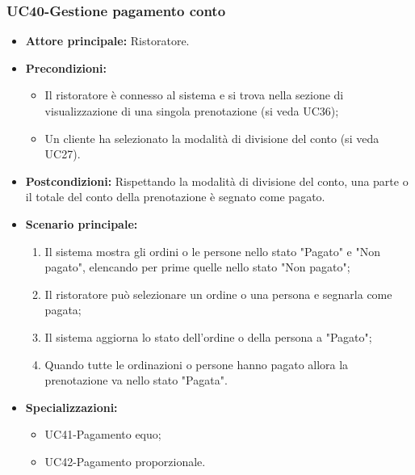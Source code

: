 \subsubsection{UC40-Gestione pagamento conto}
\begin{itemize}
    \item \textbf{Attore principale:} Ristoratore.
    \item \textbf{Precondizioni:}
    \begin{itemize}
        \item Il ristoratore è connesso al sistema e si trova nella sezione di visualizzazione di una singola prenotazione (si veda UC36);
        \item Un cliente ha selezionato la modalità di divisione del conto (si veda UC27).
    \end{itemize}
    \item \textbf{Postcondizioni:} Rispettando la modalità di divisione del conto, una parte o il totale del conto della prenotazione è segnato come pagato.
    \item \textbf{Scenario principale:}
    \begin{enumerate}
        \item Il sistema mostra gli ordini o le persone nello stato "Pagato" e "Non pagato", elencando per prime quelle nello stato "Non pagato";
        \item Il ristoratore può selezionare un ordine o una persona e segnarla come pagata;
        \item Il sistema aggiorna lo stato dell'ordine o della persona a "Pagato";
        \item Quando tutte le ordinazioni o persone hanno pagato allora la prenotazione va nello stato "Pagata".
    \end{enumerate}
    \item \textbf{Specializzazioni:}
        \begin{itemize}
            \item UC41-Pagamento equo;
            \item UC42-Pagamento proporzionale.
        \end{itemize}
\end{itemize}

